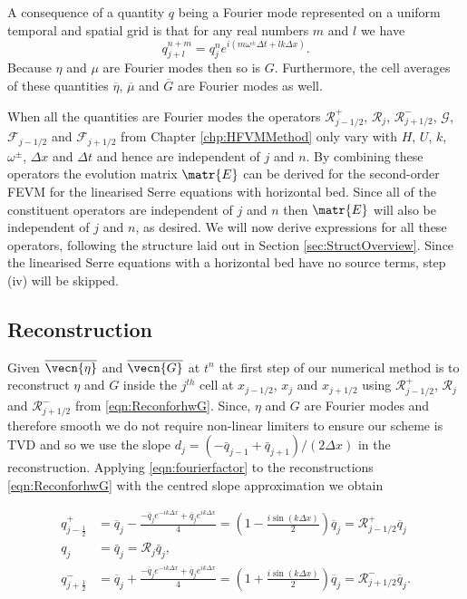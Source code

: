 A consequence of a quantity $q$ being a Fourier mode represented on a uniform temporal and spatial grid is that for any real numbers $m$ and $l$ we have
\begin{equation}
q^{n + m}_{j + l} = q^n_j e^{ i \left(m \omega^\pm \Delta t + l k \Delta x\right)}.
\label{eqn:fourierfactor}
\end{equation}
Because $\eta$ and $\mu$ are Fourier modes then so is $G$. Furthermore, the cell averages of these quantities $\overline{\eta}$, $\overline{\mu}$ and $\overline{G}$ are Fourier modes as well.

When all the quantities are Fourier modes the operators $\mathcal{R}^+_{j-1/2}$, $\mathcal{R}_{j}$, $\mathcal{R}^-_{j+1/2}$, $\mathcal{G}$, $\mathcal{F}_{j-1/2}$ and $\mathcal{F}_{j+1/2}$ from Chapter \ref{chp:HFVMMethod} only vary with $H$, $U$, $k$, $\omega^\pm$, $\Delta x$ and $\Delta t$ and hence are independent of $j$ and $n$. By combining these operators the evolution matrix $\matr{E}$ can be derived for the second-order FEVM for the linearised Serre equations with horizontal bed. Since all of the constituent operators are independent of $j$ and $n$ then $\matr{E}$ will also be independent of $j$ and $n$, as desired. We will now derive expressions for all these operators, following the structure laid out in Section \ref{sec:StructOverview}. Since the linearised Serre equations with a horizontal bed have no source terms, step (iv) will be skipped.   

\subsection{Reconstruction}
Given $\overline{\vecn{\eta}}$ and $\overline{\vecn{G}}$ at $t^n$ the first step of our numerical method is to reconstruct $\eta$ and $G$ inside the $j^{th}$ cell at $x_{j-1/2}$, $x_j$ and $x_{j+1/2}$ using $\mathcal{R}^+_{j-1/2}$, $\mathcal{R}_{j}$ and $\mathcal{R}^-_{j+1/2}$ from \eqref{eqn:ReconforhwG}. Since, $\eta$ and $G$ are Fourier modes and therefore smooth we do not require non-linear limiters to ensure our scheme is TVD and so we use the slope $d_j = \left({-\bar{q}_{j-1} +\bar{q}_{j+1}}\right)/ \left({2\Delta x} \right)$ in the reconstruction. Applying \eqref{eqn:fourierfactor} to the reconstructions \eqref{eqn:ReconforhwG} with the centred slope approximation we obtain 

\begin{subequations}
	\label{eqn:RpmfactorFDVM}
	\begin{align}
	q^+_{j-\frac{1}{2}} &= \overline{q}_j - \frac{- \overline{q}_{j} e^{-ik\Delta x} + \overline{q}_{j} e^{ik\Delta x}}{4} = \left(1  - \frac{i\sin\left(k\Delta x\right)}{2} \right)\overline{q}_{j} = \mathcal{R}^+_{j-1/2}\overline{q}_{j} \\
	q_j &= \bar{q}_j = \mathcal{R}_{j} \bar{q}_j,\\
	q^-_{j+\frac{1}{2}} &=\overline{q}_j + \frac{- \overline{q}_{j} e^{-ik\Delta x} + \overline{q}_{j} e^{ik\Delta x}}{4} = \left(1  + \frac{i\sin\left(k\Delta x\right)}{2} \right)\overline{q}_{j} =\mathcal{R}^-_{j+1/2} \overline{q}_{j}.
	\end{align}
\end{subequations}   



